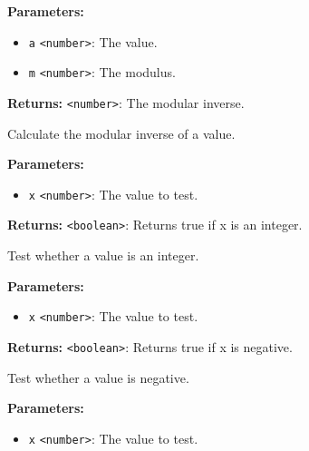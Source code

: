 \documentclass[12pt,a4paper]{article}
\begin{document}
\noindent \textbf{Parameters:}
\begin{itemize}
  \item \texttt{a} \texttt{<number>}: The value.
  \item \texttt{m} \texttt{<number>}: The modulus.
\end{itemize}

\noindent \textbf{Returns:} \texttt{<number>}: The modular inverse.

\noindent Calculate the modular inverse of a value.

\vspace{5mm}
\noindent {}


\noindent \textbf{Parameters:}
\begin{itemize}
  \item \texttt{x} \texttt{<number>}: The value to test.
\end{itemize}

\noindent \textbf{Returns:} \texttt{<boolean>}: Returns true if x is an integer.

\noindent Test whether a value is an integer.

\vspace{5mm}
\noindent {}


\noindent \textbf{Parameters:}
\begin{itemize}
  \item \texttt{x} \texttt{<number>}: The value to test.
\end{itemize}

\noindent \textbf{Returns:} \texttt{<boolean>}: Returns true if x is negative.

\noindent Test whether a value is negative.

\vspace{5mm}
\noindent {}


\noindent \textbf{Parameters:}
\begin{itemize}
  \item \texttt{x} \texttt{<number>}: The value to test.
\end{itemize}
\end{document}
